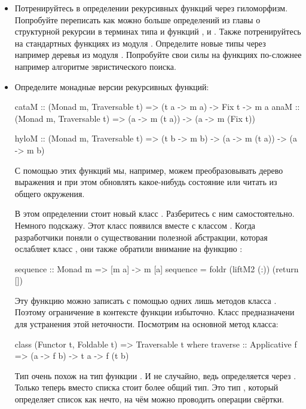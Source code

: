 \begin{itemize}
\item
  Потренируйтесь в определении рекурсивных функций через гиломорфизм.
  Попробуйте переписать как можно больше определений из главы о
  структурной рекурсии в терминах типа  и функций ,
   и . Также потренируйтесь на стандартных функциях из
  модуля . Определите новые типы через  например
  деревья из модуля . Попробуйте свои силы на функциях
  по-сложнее например алгоритме эвристического поиска.
\item
  Определите монадные версии рекурсивных функций:


  \begin{code}
  cataM :: (Monad m, Traversable t) => (t a -> m a) -> Fix t -> m a
  anaM  :: (Monad m, Traversable t) => (a -> m (t a)) -> (a -> m (Fix t))

  hyloM :: (Monad m, Traversable t) => (t b -> m b) -> (a -> m (t a)) -> (a -> m b)
  \end{code}

  С помощью этих функций мы, например, можем преобразовывать дерево
  выражения и при этом обновлять какое-нибудь состояние или читать из
  общего окружения.

  В этом определении стоит новый класс . Разберитесь с
  ним самостоятельно. Немного подскажу. Этот класс появился вместе с
  классом . Когда разработчики поняли о существовании
  полезной абстракции, которая ослабляет класс , они также
  обратили внимание на функцию :


  \begin{code}
  sequence :: Monad m => [m a] -> m [a]
  sequence = foldr (liftM2 (:)) (return [])  
  \end{code}

  Эту функцию можно записать с помощью одних лишь методов класса
  . Поэтому ограничение в контексте функции избыточно.
  Класс  предназначени для устранения этой неточности.
  Посмотрим на основной метод класса:


  \begin{code}
  class (Functor t, Foldable t) => Traversable t where
      traverse :: Applicative f => (a -> f b) -> t a -> f (t b)
  \end{code}

  Тип очень похож на тип функции . И не случайно, ведь
   определяется через . Только теперь вместо
  списка стоит более общий тип. Это тип , который
  определяет список как нечто, на чём можно проводить операции свёртки.
\end{itemize}
